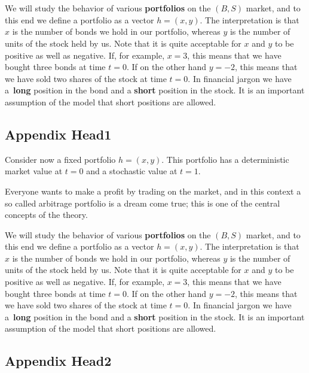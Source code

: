 \documentclass{Base}
\begin{document}
\clearpage

\setcounter{chapter}{0}

\appendix

\chapter{}

We will study the behavior of various {\bf portfolios}
 on the $(B,S)$
market, and to this end we define a portfolio as a vector
$h=(x,y)$. The interpretation is that $x$ is the number of bonds
we hold in our portfolio, whereas $y$ is the number of units of
the stock held by us. Note that it is quite acceptable for $x$ and
$y$ to be positive as well as negative. If, for example, $x=3$,
this means that we have bought three bonds at time $t=0$. If on
the other hand $y=-2$, this means that we have sold two shares of
the stock at time $t=0$. In financial jargon we have a~{\bf long}
position in the bond and a {\bf short} position in the stock. It
is an important assumption of the model that short positions are
allowed.

\section{Appendix Head1}

Consider now a fixed portfolio $h=(x,y)$. This portfolio has a
deterministic market value at $t=0$ and a stochastic value at
$t=1$.

Everyone wants to make a profit by trading on the market, and in
this context a so called arbitrage portfolio is a dream come true;
this is one of the central concepts of the theory.

We will study the behavior of various {\bf portfolios}
 on the $(B,S)$
market, and to this end we define a portfolio as a vector
$h=(x,y)$. The interpretation is that $x$ is the number of bonds
we hold in our portfolio, whereas $y$ is the number of units of
the stock held by us. Note that it is quite acceptable for $x$ and
$y$ to be positive as well as negative. If, for example, $x=3$,
this means that we have bought three bonds at time $t=0$. If on
the other hand $y=-2$, this means that we have sold two shares of
the stock at time $t=0$. In financial jargon we have a~{\bf long}
position in the bond and a {\bf short} position in the stock. It
is an important assumption of the model that short positions are
allowed.

\section{Appendix Head2}
\end{document}
